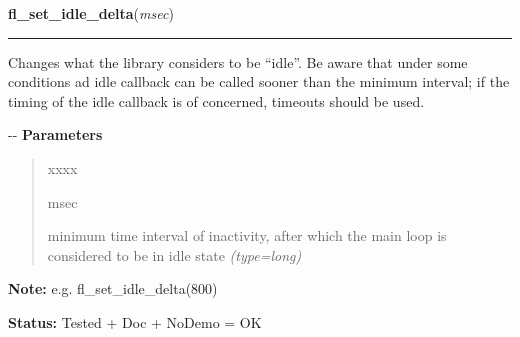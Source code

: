 \hspace{.8\funcindent}\begin{boxedminipage}{\funcwidth}

    \raggedright \textbf{fl\_set\_idle\_delta}(\textit{msec})

    \vspace{-1.5ex}

    \rule{\textwidth}{0.5\fboxrule}
\setlength{\parskip}{2ex}

Changes what the library considers to be ``idle''. Be aware that under
some conditions ad idle callback can be called sooner than the minimum
interval; if the timing of the idle callback is of concerned, timeouts
should be used.

-{}-
\setlength{\parskip}{1ex}
      \textbf{Parameters}
      \vspace{-1ex}

      \begin{quote}
        \begin{Ventry}{xxxx}

          \item[msec]


minimum time interval of inactivity, after which the main loop is
considered to be in idle state
            {\it (type=long)}

        \end{Ventry}

      \end{quote}

\textbf{Note:} 
e.g. fl\_set\_idle\_delta(800)


\textbf{Status:} 
Tested + Doc + NoDemo = OK


    \end{boxedminipage}

    \label{xformslib:flxbasic:fl_add_event_callback}

    \vspace{0.5ex}

